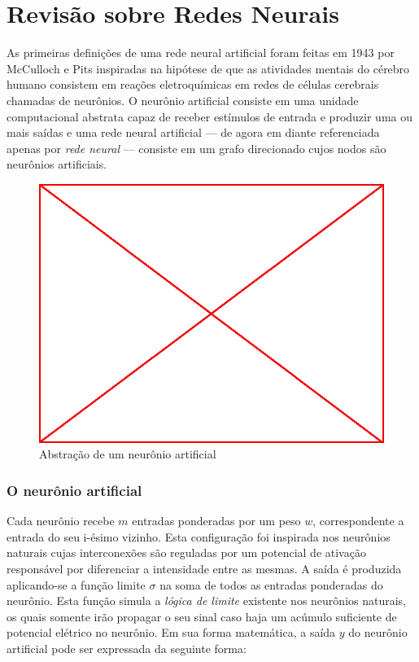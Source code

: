 

\chapter{Revisão sobre Redes Neurais}

As primeiras definições de uma rede neural artificial foram feitas em 1943 por
McCulloch e Pits inspiradas na hipótese de que as atividades mentais do cérebro
humano consistem em reações eletroquímicas em redes de células cerebrais
chamadas de neurônios. O neurônio artificial consiste em uma unidade
computacional abstrata capaz de receber estímulos de entrada e produzir uma ou
mais saídas e uma rede neural artificial --- de agora em diante referenciada
apenas por \emph{rede neural} --- consiste em um grafo direcionado cujos nodos
são neurônios artificiais.

\begin{figure}
  \caption{Abstração de um neurônio artificial}
  \begin{center}
    \includegraphics[scale=0.5]{placeholder}
  \end{center}
\end{figure}

\subsection{O neurônio artificial}

Cada neurônio recebe $m$ entradas ponderadas por um peso $w$,
correspondente a entrada do seu i-ésimo vizinho. Esta configuração foi
inspirada nos neurônios naturais cujas interconexões são reguladas por um
potencial de ativação responsável por diferenciar a intensidade entre as
mesmas. A saída é produzida aplicando-se a função limite $\sigma$ na soma
de todos as entradas ponderadas do neurônio. Esta função simula a \emph{lógica
  de limite} existente nos neurônios naturais, os quais somente irão propagar o
seu sinal caso haja um acúmulo suficiente de potencial elétrico no neurônio. Em
sua forma matemática, a saída $y$ do neurônio artificial pode ser expressada da
seguinte forma:

